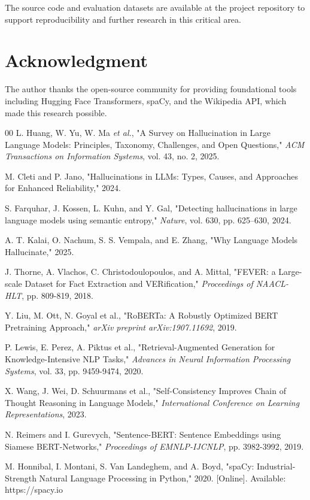 \documentclass[conference]{IEEEtran}
\begin{document}
The source code and evaluation datasets are available at the project repository to support reproducibility and further research in this critical area.

\section*{Acknowledgment}

The author thanks the open-source community for providing foundational tools including Hugging Face Transformers, spaCy, and the Wikipedia API, which made this research possible.

\begin{thebibliography}{00}
 L. Huang, W. Yu, W. Ma \textit{et al.}, "A Survey on Hallucination in Large Language Models: Principles, Taxonomy, Challenges, and Open Questions," \textit{ACM Transactions on Information Systems}, vol. 43, no. 2, 2025.

 M. Cleti and P. Jano, "Hallucinations in LLMs: Types, Causes, and Approaches for Enhanced Reliability," 2024.

 S. Farquhar, J. Kossen, L. Kuhn, and Y. Gal, "Detecting hallucinations in large language models using semantic entropy," \textit{Nature}, vol. 630, pp. 625--630, 2024.

 A. T. Kalai, O. Nachum, S. S. Vempala, and E. Zhang, "Why Language Models Hallucinate," 2025.

 J. Thorne, A. Vlachos, C. Christodoulopoulos, and A. Mittal, "FEVER: a Large-scale Dataset for Fact Extraction and VERification," \textit{Proceedings of NAACL-HLT}, pp. 809-819, 2018.

 Y. Liu, M. Ott, N. Goyal et al., "RoBERTa: A Robustly Optimized BERT Pretraining Approach," \textit{arXiv preprint arXiv:1907.11692}, 2019.

 P. Lewis, E. Perez, A. Piktus et al., "Retrieval-Augmented Generation for Knowledge-Intensive NLP Tasks," \textit{Advances in Neural Information Processing Systems}, vol. 33, pp. 9459-9474, 2020.

 X. Wang, J. Wei, D. Schuurmans et al., "Self-Consistency Improves Chain of Thought Reasoning in Language Models," \textit{International Conference on Learning Representations}, 2023.

 N. Reimers and I. Gurevych, "Sentence-BERT: Sentence Embeddings using Siamese BERT-Networks," \textit{Proceedings of EMNLP-IJCNLP}, pp. 3982-3992, 2019.

 M. Honnibal, I. Montani, S. Van Landeghem, and A. Boyd, "spaCy: Industrial-Strength Natural Language Processing in Python," 2020. [Online]. Available: https://spacy.io
\end{thebibliography}
\end{document}
